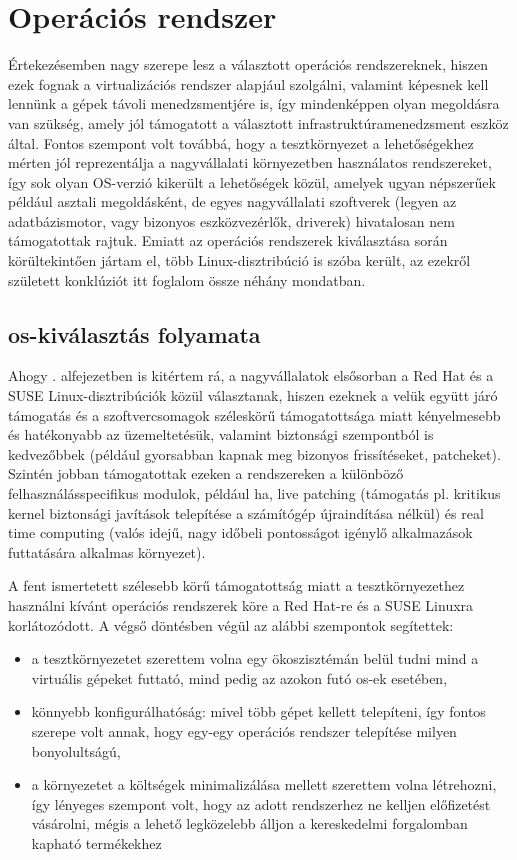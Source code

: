\section{Operációs rendszer}
Értekezésemben nagy szerepe lesz a választott operációs rendszereknek, hiszen ezek fognak a virtualizációs rendszer alapjául szolgálni, valamint képesnek kell lennünk a gépek távoli menedzsmentjére is, így mindenképpen olyan megoldásra van szükség, amely jól támogatott a választott infrastruktúramenedzsment eszköz által. Fontos szempont volt továbbá, hogy a tesztkörnyezet a lehetőségekhez mérten jól reprezentálja a nagyvállalati környezetben használatos rendszereket, így sok olyan OS-verzió kikerült a lehetőségek közül, amelyek ugyan népszerűek például asztali megoldásként, de egyes nagyvállalati szoftverek (legyen az adatbázismotor, vagy bizonyos eszközvezérlők, driverek) hivatalosan nem támogatottak rajtuk. Emiatt az operációs rendszerek kiválasztása során körültekintően jártam el, több Linux-disztribúció is szóba került, az ezekről született konklúziót itt foglalom össze néhány mondatban.

\subsection{\acrshort{os}-kiválasztás folyamata}
Ahogy . alfejezetben is kitértem rá, a nagyvállalatok elsősorban a Red Hat és a SUSE Linux-disztribúciók közül választanak, hiszen ezeknek a velük együtt járó támogatás és a szoftvercsomagok széleskörű támogatottsága miatt kényelmesebb és hatékonyabb az üzemeltetésük, valamint biztonsági szempontból is kedvezőbbek (például gyorsabban kapnak meg bizonyos frissítéseket, patcheket). Szintén jobban támogatottak ezeken a rendszereken a különböző felhasználásspecifikus modulok, például \acrfull{ha}, live patching (támogatás pl. kritikus kernel biztonsági javítások telepítése a számítógép újraindítása nélkül) és real time computing (valós idejű, nagy időbeli pontosságot igénylő alkalmazások futtatására alkalmas környezet).

A fent ismertetett szélesebb körű támogatottság miatt a tesztkörnyezethez használni kívánt operációs rendszerek köre a Red Hat-re és a SUSE Linuxra korlátozódott. A végső döntésben végül az alábbi szempontok segítettek:
\begin{itemize}
	\item a tesztkörnyezetet szerettem volna egy ökoszisztémán belül tudni mind a virtuális gépeket futtató, mind pedig az azokon futó \acrshort{os}-ek esetében,
	\item könnyebb konfigurálhatóság: mivel több gépet kellett telepíteni, így fontos szerepe volt annak, hogy egy-egy operációs rendszer telepítése milyen bonyolultságú,
	\item a környezetet a költségek minimalizálása mellett szerettem volna létrehozni, így lényeges szempont volt, hogy az adott rendszerhez ne kelljen előfizetést vásárolni, mégis a lehető legközelebb álljon a kereskedelmi forgalomban kapható termékekhez
\end{itemize}

